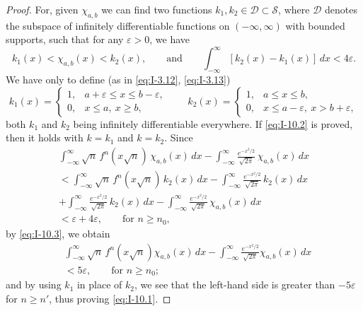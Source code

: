 \begin{proof}
For, given $\chi_{a,b}$ we can find two functions $k_1,k_2\in\mathcal D\subset\mathcal S$, where $\mathcal D$ denotes the subspace of infinitely differentiable functions on $(-\infty,\infty)$ with bounded supports, such that for any $\varepsilon>0$, we have
\begin{equation}\label{eq:I-10.3}\tag{10.3}
k_1(x)<\chi_{a,b}(x)<k_2(x),\qquad\text{and}\qquad
\int_{-\infty}^{\infty}[k_2(x)-k_1(x)]\,dx<4\varepsilon.
\end{equation}
We have only to define (as in \eqref{eq:I-3.12}, \eqref{eq:I-3.13})
\begin{equation}\tag{10.4}\label{eq:I-10.4}
k_1(x)=
\begin{cases}
1,&a+\varepsilon\le x\le b-\varepsilon,\\
0,&x\le a,\ x\ge b,
\end{cases}
\qquad
k_2(x)=
\begin{cases}
1,&a\le x\le b,\\
0,&x\le a-\varepsilon,\ x>b+\varepsilon,
\end{cases}
\end{equation}
both $k_1$ and $k_2$ being infinitely differentiable everywhere. If \eqref{eq:I-10.2} is proved, then it holds with $k=k_1$ and $k=k_2$. Since
\begin{multline*}
\int_{-\infty}^{\infty}\sqrt n\,f^n(x\sqrt n)\,\chi_{a,b}(x)\,dx
-\int_{-\infty}^{\infty}\frac{e^{-x^{2}/2}}{\sqrt{2\pi}}\,\chi_{a,b}(x)\,dx\\
<\int_{-\infty}^{\infty}\sqrt n\,f^n(x\sqrt n)\,k_2(x)\,dx
-\int_{-\infty}^{\infty}\frac{e^{-x^{2}/2}}{\sqrt{2\pi}}\,k_2(x)\,dx\\
+\int_{-\infty}^{\infty}\frac{e^{-x^{2}/2}}{\sqrt{2\pi}}\,k_2(x)\,dx
-\int_{-\infty}^{\infty}\frac{e^{-x^{2}/2}}{\sqrt{2\pi}}\,\chi_{a,b}(x)\,dx\\
<\varepsilon+4\varepsilon,\qquad\text{for }n\ge n_0,
\end{multline*}
by \eqref{eq:I-10.3}, we obtain
\begin{equation*}
\begin{aligned}
&\int_{-\infty}^{\infty}\sqrt n\,f^n(x\sqrt n)\chi_{a,b}(x)\,dx - \int_{-\infty}^{\infty}\frac{e^{-x^{2}/2}}{\sqrt{2\pi}}\chi_{a,b}(x)\,dx\\
&< 5\varepsilon,  \qquad\text{for }n \ge n_0;
\end{aligned}
\end{equation*}
and by using $k_1$ in place of $k_2$, we see that the left-hand side is greater than $-5\varepsilon$ for $n\ge n'$, thus proving \eqref{eq:I-10.1}.


\end{proof}
